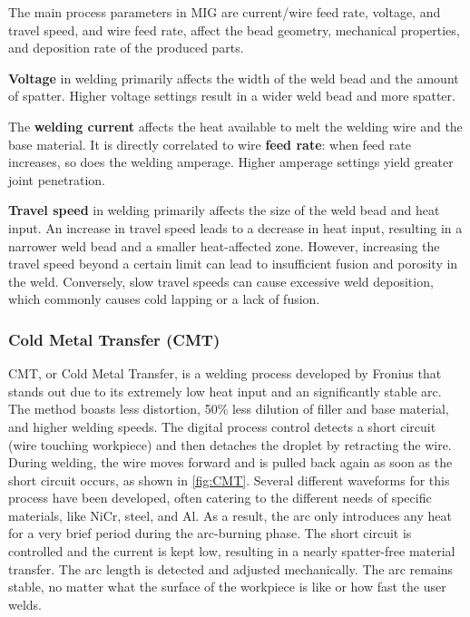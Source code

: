 The main process parameters in MIG are current/wire feed rate, voltage, and travel speed, and wire feed rate, affect the bead geometry, mechanical properties, and deposition rate of the produced parts.


\textbf{Voltage} in welding primarily affects the width of the weld bead and the amount of spatter. Higher voltage settings result in a wider weld bead and more spatter.

The \textbf{welding current} affects the heat available to melt the welding wire and the base material. It is directly correlated to wire \textbf{feed rate}: when feed rate increases, so does the welding amperage. Higher amperage settings yield greater joint penetration.

\textbf{Travel speed} in welding primarily affects the size of the weld bead and heat input. An increase in travel speed leads to a decrease in heat input, resulting in a narrower weld bead and a smaller heat-affected zone. However, increasing the travel speed beyond a certain limit can lead to insufficient fusion and porosity in the weld. Conversely, slow travel speeds can cause excessive weld deposition, which commonly causes cold lapping or a lack of fusion.



\subsubsection{Cold Metal Transfer (CMT)}

CMT, or Cold Metal Transfer, is a welding process developed by Fronius that stands out due to its extremely low heat input and an significantly stable arc. The method boasts less distortion, 50\% less dilution of filler and base material, and higher welding speeds.
The digital process control detects a short circuit (wire touching workpiece) and then detaches the droplet by retracting the wire. During welding, the wire moves forward and is pulled back again as soon as the short circuit occurs, as shown in \autoref{fig:CMT}. Several different waveforms for this process have been developed, often catering to the different needs of specific materials, like NiCr, steel, and Al.
As a result, the arc only introduces any heat for a very brief period during the arc-burning phase. The short circuit is controlled and the current is kept low, resulting in a nearly spatter-free material transfer. The arc length is detected and adjusted mechanically. The arc remains stable, no matter what the surface of the workpiece is like or how fast the user welds.

